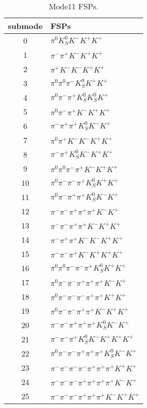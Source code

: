 \begin{table}[h!]
\begin{center}
\begin{tabular}{cl}
\hline
submode& FSPs\\
\hline
0 & $\pi^0 K_S^0 K^- K^+ K^+ $ \\
1 & $\pi^- \pi^+ K^- K^+ K^+ $ \\
2 & $\pi^+ K^- K^- K^+ K^+ $ \\
3 & $\pi^0 \pi^0 \pi^- K_S^0 K^+ K^+ $ \\
4 & $\pi^0 \pi^- \pi^+ K_S^0 K_S^0 K^+ $ \\
5 & $\pi^0 \pi^- \pi^+ K^- K^+ K^+ $ \\
6 & $\pi^- \pi^+ \pi^+ K_S^0 K^- K^+ $ \\
7 & $\pi^0 \pi^+ K^- K^- K^+ K^+ $ \\
8 & $\pi^- \pi^+ K_S^0 K^- K^+ K^+ $ \\
9 & $\pi^0 \pi^0 \pi^- \pi^+ K^- K^+ K^+ $ \\
10 & $\pi^0 \pi^- \pi^- \pi^+ K_S^0 K^+ K^+ $ \\
11 & $\pi^0 \pi^- \pi^+ \pi^+ K_S^0 K^- K^+ $ \\
12 & $\pi^- \pi^- \pi^+ \pi^+ \pi^+ K^- K^+ $ \\
13 & $\pi^- \pi^- \pi^+ \pi^+ K^- K^+ K^+ $ \\
14 & $\pi^- \pi^+ \pi^+ K^- K^- K^+ K^+ $ \\
15 & $\pi^- \pi^- \pi^+ K^- K^+ K^+ K^+ $ \\
16 & $\pi^0 \pi^0 \pi^- \pi^- \pi^+ K_S^0 K^+ K^+ $ \\
17 & $\pi^0 \pi^- \pi^- \pi^+ \pi^+ \pi^+ K^- K^+ $ \\
18 & $\pi^0 \pi^- \pi^- \pi^- \pi^+ \pi^+ K^+ K^+ $ \\
19 & $\pi^0 \pi^- \pi^- \pi^+ \pi^+ K^- K^+ K^+ $ \\
20 & $\pi^- \pi^- \pi^+ \pi^+ \pi^+ K_S^0 K^- K^+ $ \\
21 & $\pi^- \pi^- \pi^+ K_S^0 K^- K^+ K^+ K^+ $ \\
22 & $\pi^0 \pi^- \pi^- \pi^+ \pi^+ \pi^+ K_S^0 K^- K^+ $ \\
23 & $\pi^- \pi^- \pi^- \pi^- \pi^+ \pi^+ \pi^+ K^+ K^+ $ \\
24 & $\pi^- \pi^- \pi^- \pi^+ \pi^+ \pi^+ \pi^+ K^- K^+ $ \\
25 & $\pi^- \pi^- \pi^- \pi^+ \pi^+ \pi^+ K^- K^+ K^+ $ \\
\hline
\end{tabular}
\label{tab:Mode11FSPs}
\caption{Mode11 FSPs.}
\end{center}
\end{table}
